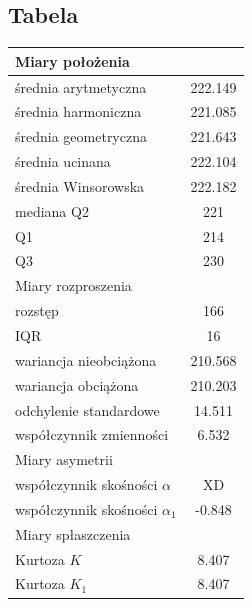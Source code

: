 \documentclass{article}
\theoremstyle{break}
\begin{document}
	\subsection{Tabela}
	\begin{longtable}[c]{| c | c |}
		\hline
		\multicolumn{2}{|l|}{\cellcolor[HTML]{DBDBDB}Miary położenia}    \\ \hline
		\multicolumn{1}{|l|}{średnia arytmetyczna}          & 222.149    \\ \hline
		\multicolumn{1}{|l|}{średnia harmoniczna}           & 221.085    \\ \hline
		\multicolumn{1}{|l|}{średnia geometryczna}          & 221.643    \\ \hline
		\multicolumn{1}{|l|}{średnia ucinana}               & 222.104    \\ \hline
		\multicolumn{1}{|l|}{średnia Winsorowska}           & 222.182    \\ \hline
		\multicolumn{1}{|l|}{mediana Q2}                    & 221        \\ \hline
		\multicolumn{1}{|l|}{Q1}                            & 214        \\ \hline
		\multicolumn{1}{|l|}{Q3}                            & 230        \\ \hline
		\multicolumn{2}{|l|}{\cellcolor[HTML]{DBDBDB}Miary rozproszenia} \\ \hline
		\multicolumn{1}{|l|}{rozstęp}                       & 166        \\ \hline
		\multicolumn{1}{|l|}{IQR}                           & 16         \\ \hline
		\multicolumn{1}{|l|}{wariancja nieobciążona}        & 210.568    \\ \hline
		\multicolumn{1}{|l|}{wariancja obciążona}           & 210.203    \\ \hline
		\multicolumn{1}{|l|}{odchylenie standardowe}        & 14.511     \\ \hline
		\multicolumn{1}{|l|}{współczynnik zmienności}       & 6.532      \\ \hline
		\multicolumn{2}{|l|}{\cellcolor[HTML]{DBDBDB}Miary asymetrii}    \\ \hline
		\multicolumn{1}{|l|}{współczynnik skośności $\alpha$}      & XD          \\ \hline
		\multicolumn{1}{|l|}{współczynnik skośności $\alpha_1$}     & -0.848     \\ \hline
		\multicolumn{2}{|l|}{\cellcolor[HTML]{DBDBDB}Miary spłaszczenia} \\ \hline
		\multicolumn{1}{|l|}{Kurtoza $K$}                       & 8.407      \\ \hline
		\multicolumn{1}{|l|}{Kurtoza $K_1$}                       & 8.407      \\ \hline
	\end{longtable}
	
\end{document}

